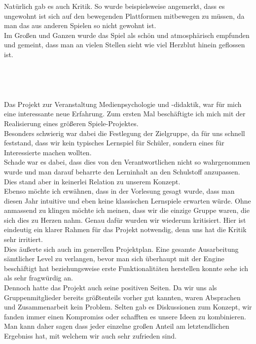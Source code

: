 \documentclass[10pt,a4paper,notitlepage]{report}
\begin{document}
	Natürlich gab es auch Kritik. So wurde beispielsweise angemerkt, dass es ungewohnt ist sich auf den bewegenden Plattformen mitbewegen zu müssen, da man das aus anderen Spielen so nicht gewohnt ist.\\

	Im Großen und Ganzen wurde das Spiel als schön und atmosphärisch empfunden und gemeint, dass man an vielen Stellen sieht wie viel Herzblut hinein geflossen ist.\\
	
	\clearpage
	\marginpar{\vspace{3.0mm} \color{orange}\rule{0.8mm}{53.3mm} \\[3mm] \color{hellorange}\rule{0.8mm}{170mm}}
	\par\bigskip
	
	\\\par\medskip\Text
	\\\par\medskip\Text
	Das Projekt zur Veranstaltung Medienpsychologie und -didaktik, war für mich eine interessante neue Erfahrung. Zum ersten Mal beschäftigte ich mich mit der Realisierung eines größeren Spiele-Projektes. \\
	Besonders schwierig war dabei die Festlegung der Zielgruppe, da für uns schnell feststand, dass wir kein typisches Lernspiel für Schüler, sondern eines für Interessierte machen wollten.\\
	Schade war es dabei, dass dies von den Verantwortlichen nicht so wahrgenommen wurde und man darauf beharrte den Lerninhalt an den Schulstoff anzupassen. Dies stand aber in keinerlei Relation zu unserem Konzept.\\
	Ebenso möchte ich erwähnen, dass in der Vorlesung gesagt wurde, dass man diesen Jahr intuitive und eben keine klassischen Lernspiele erwarten würde. Ohne anmassend zu klingen möchte ich meinen, dass wir die einzige Gruppe waren, die sich dies zu 	Herzen nahm. Genau dafür wurden wir wiederum kritisiert. Hier ist eindeutig ein klarer Rahmen für das Projekt notwendig, denn uns hat die Kritik sehr irritiert.\\
	Dies äußerte sich auch im generellen Projektplan. Eine gesamte Ausarbeitung sämtlicher Level zu verlangen, bevor man sich überhaupt mit der Engine beschäftigt hat beziehungsweise erste Funktionalitäten herstellen konnte sehe ich als sehr fragwürdig an.\\
	Dennoch hatte das Projekt auch seine positiven Seiten. Da wir uns als Gruppenmitglieder bereits größtenteils vorher gut kannten, waren Absprachen und Zusammenarbeit kein Problem. Selten gab es Diskussionen zum Konzept, wir fanden immer einen Kompromiss oder schafften es unsere Ideen zu kombinieren. Man kann daher sagen dass jeder einzelne großen Anteil am 	letztendlichen Ergebniss hat, mit welchem wir auch sehr zufrieden sind.\\
\end{document}
